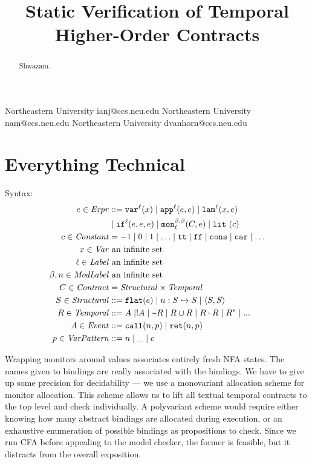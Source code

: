 \documentclass[preprint,onecolumn,9pt]{sigplanconf} %
\begin{document}
\copyrightdata{[to be supplied]}
\title{Static Verification of Temporal Higher-Order Contracts}

           {Northeastern University}
           {ianj@ccs.neu.edu}
           {Northeastern University}
           {nam@ccs.neu.edu}
           {Northeastern University}
           {dvanhorn@ccs.neu.edu}
\maketitle
\begin{abstract}
  Shwazam.
\end{abstract}

\section{Everything Technical}
Syntax:
\begin{align*}
\mexp \in \Expr &::=
      \svar[^\mlab]{\mvar}
 \alt \sapp[^\mlab]{\mexp}{\mexp}
 \alt \slam[^\mlab]{\mvar}{\mexp} \\
&\alt \sif[^\mlab]{\mexp}{\mexp}{\mexp} 
 \alt \sMon{\mmlab}{\mmlab}{\mlab}{\mcontract, \mexp}
 \alt \slit{\mconstant} \\
\mconstant \in \Constant &= -1 \alt 0 \alt 1 \alt \ldots \alt \strue \alt \sfalse \alt \scons \alt \scar \alt \ldots \\
\mvar \in \Var &\text{ an infinite set} \\
\mlab \in \Label &\text{ an infinite set} \\
\mmlab,\mname \in \ModuleLabel &\text{ an infinite set} \\
\mcontract \in \Contract &= \SContract \times \TContract \\
\mscon \in \SContract &::= \sflat{\mexp} \alt \sarr{\mname}{\mscon}{\mscon} \alt \sconsc{\mscon}{\mscon} \\
\mtcon \in \TContract &::=
      \mevent
 \alt \snonevent{\mevent}
 \alt \stnot{\mtcon}
 \alt \stOr{\mtcon}{\mtcon}
 \alt \stseq{\mtcon}{\mtcon}
 \alt \stmany{\mtcon}
 \alt \sddd \\
\mevent \in \Event &::= \scallev{\mname}{\mvpat} \alt \sretev{\mname}{\mvpat} \\
\mvpat \in \VPat &::= \mname \alt \swc \alt \mconstant
\end{align*}

Wrapping monitors around values associates entirely fresh NFA
states. The names given to bindings are really associated with the
bindings. We have to give up some precision for decidability --- we
use a monovariant allocation scheme for monitor allocation. This
scheme allows us to lift all textual temporal contracts to the top
level and check individually. A polyvariant scheme would require
either knowing how many abstract bindings are allocated during
execution, or an exhaustive enumeration of possible bindings as
propositions to check. Since we run CFA before appealing to the model
checker, the former is feasible, but it distracts from the overall
exposition.
\end{document}
